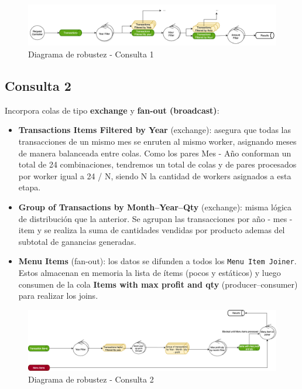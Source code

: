 \documentclass[titlepage,a4paper]{article}
\begin{document}
\begin{figure}[H]
    \centering
    \includegraphics[width=1.0\textwidth]{consulta1.png}
    \caption{Diagrama de robustez - Consulta 1}
\end{figure}


\subsection*{Consulta 2}
Incorpora colas de tipo \textbf{exchange} y \textbf{fan-out (broadcast)}:

\begin{itemize}
    \item \textbf{Transactions Items Filtered by Year} (exchange): asegura que todas las transacciones de un mismo mes se enruten al mismo worker, asignando meses de manera balanceada entre colas. Como los pares Mes - Año conforman un total de 24 combinaciones, tendremos un total de colas y de pares procesados por worker igual a 24 / N, siendo N la cantidad de workers asignados a esta etapa.
    \item \textbf{Group of Transactions by Month--Year--Qty} (exchange): misma lógica de distribución que la anterior. Se agrupan las transacciones por año - mes - item y se realiza la suma de cantidades vendidas por producto ademas del subtotal de ganancias generadas.
    \item \textbf{Menu Items} (fan-out): los datos se difunden a todos los \texttt{Menu Item Joiner}. Estos almacenan en memoria la lista de ítems (pocos y estáticos) y luego consumen de la cola \textbf{Items with max profit and qty} (producer--consumer) para realizar los joins.
\end{itemize}

\begin{figure}[H]
    \centering
    \includegraphics[width=1.0\textwidth]{consulta2.png}
    \caption{Diagrama de robustez - Consulta 2}
\end{figure}
\end{document}
